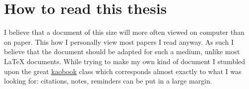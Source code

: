 \chapter*{How to read this thesis}

I believe that a document of this size will more often viewed on computer than
on paper. This how I personally view most papers I read anyway.
As such I believe that the document should be adapted for such a medium, unlike
most \LaTeX{} documents.
While trying to make my own kind of document I stumbled upon the great
\href{https://github.com/fmarotta/kaobook/}{kaobook} class which corresponds
almost exactly to what I was looking for: citations, notes, reminders can be put
in a large margin.




